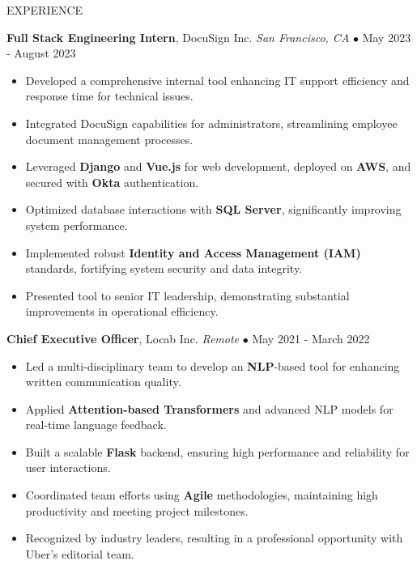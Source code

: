 \documentclass{resume} %
\begin{document}
\begin{rSection}{EXPERIENCE}

\textbf{Full Stack Engineering Intern}, DocuSign Inc. \hfill \textit{San Francisco, CA} $\bullet$ May 2023 - August 2023
\vspace{-2mm}
\begin{itemize}
\itemsep -6pt {}

            \item Developed a comprehensive internal tool enhancing IT support efficiency and response time for technical issues.
            \item Integrated DocuSign capabilities for administrators, streamlining employee document management processes.
            \item Leveraged \textbf{Django} and \textbf{Vue.js} for web development, deployed on \textbf{AWS}, and secured with \textbf{Okta} authentication.
            \item Optimized database interactions with \textbf{SQL Server}, significantly improving system performance.
            \item Implemented robust \textbf{Identity and Access Management (IAM)} standards, fortifying system security and data integrity.
            \item Presented tool to senior IT leadership, demonstrating substantial improvements in operational efficiency.
        \end{itemize}

\vspace{-1mm}

\textbf{Chief Executive Officer}, Locab Inc. \hfill \textit{Remote} $\bullet$ May 2021 - March 2022
\vspace{-2mm}
\begin{itemize}
\itemsep -6pt {}

            \item Led a multi-disciplinary team to develop an \textbf{NLP}-based tool for enhancing written communication quality.
            \item Applied \textbf{Attention-based Transformers} and advanced NLP models for real-time language feedback.
            \item Built a scalable \textbf{Flask} backend, ensuring high performance and reliability for user interactions.
            \item Coordinated team efforts using \textbf{Agile} methodologies, maintaining high productivity and meeting project milestones.
            \item Recognized by industry leaders, resulting in a professional opportunity with Uber's editorial team.
        \end{itemize}


\end{rSection}
\end{document}
